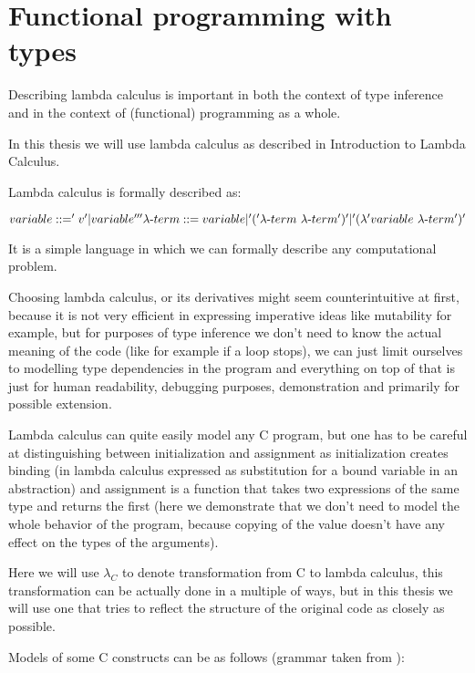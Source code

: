 \chapter{Functional programming with types}

Describing lambda calculus is important in both the context of type inference and in the context of (functional)
programming as a whole.

In this thesis we will use lambda calculus as described in Introduction to Lambda Calculus.  %

Lambda calculus is formally described as:

$variable ::= 'v' | variable ''' \\ \lambda\mbox{-}term ::= variable | '(' \lambda\mbox{-}term\ \lambda\mbox{-}term ')' |  '(\lambda' variable\ \lambda\mbox{-}term ')'$


It is a simple language in which we can formally describe any computational problem.

Choosing lambda calculus, or its derivatives might seem counterintuitive at first, because it
is not very efficient in expressing imperative ideas like mutability for example, but for
purposes of type inference we don't need to know the actual meaning of the code (like for example
if a loop stops), we can just limit ourselves to modelling type dependencies in the program and
everything on top of that is just for human readability, debugging purposes, demonstration and
primarily for possible extension.

Lambda calculus can quite easily model any C program, but one has to be careful at distinguishing
between initialization and assignment as initialization creates binding (in lambda calculus expressed
as substitution for a bound variable in an abstraction) and assignment is a function that takes two
expressions of the same type and returns the first (here we demonstrate that we don't need to
model the whole behavior of the program, because copying of the value doesn't have any effect on
the types of the arguments).

Here we will use $\lambda_C$ to denote transformation from C to lambda calculus,
this transformation can be actually done in a multiple of ways, but in this thesis we will use one that tries to
reflect the structure of the original code as closely as possible.

Models of some C constructs can be as follows (grammar taken from ): %

